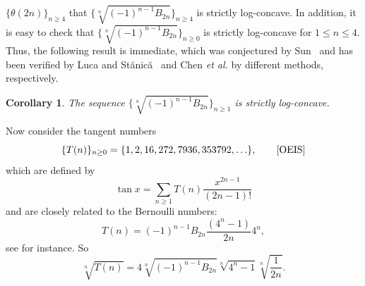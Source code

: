 \documentclass[12pt,reqno]{article}
\newtheorem{cor}[thm]{Corollary}
\theoremstyle{definition}
\numberwithin{equation}{section}
\begin{document}
$\{\theta(2n)\}_{n\geq4}$ that
$\{\sqrt[n]{(-1)^{n-1}B_{2n}}\}_{n\geq4}$ is strictly log-concave.
In addition, it is easy to check that
$\{\sqrt[n]{(-1)^{n-1}B_{2n}}\}_{n\geq0}$ is strictly log-concave
for $1\leq n\leq 4$. Thus, the following result is immediate, which
was conjectured by Sun~\cite[Conjecture 2.15]{Sun-conj} and has been
verified by Luca and St\u{a}nic\u{a}~\cite{LS12} and Chen {\it et
al.} \cite{CGW1} by different methods, respectively.
\begin{cor}
The sequence $\{\sqrt[n]{(-1)^{n-1}B_{2n}}\}_{n\ge 1}$ is strictly
log-concave.
\end{cor}
Now consider the tangent numbers
$$\{T(n)\}_{n\ge 0}=\{1, 2, 16, 272, 7936, 353792,\ldots\},\qquad \cite[A000182]{OEIS}$$
which are defined by
$$\tan{ x}=\sum_{n\geq1}T(n)\frac{x^{2n-1}}{(2n-1)!}$$
and are closely related to the Bernoulli numbers:
$$T(n)=(-1)^{n-1}B_{2n}\frac{(4^{n}-1)}{2n}4^{n},$$
see \cite[(6.93)]{GKP94} for instance. So
$$\sqrt[n]{T(n)}=4\sqrt[n]{(-1)^{n-1}B_{2n}}\sqrt[n]{4^{n}-1}\sqrt[n]{\frac{1}{2n}}.$$
\end{document}
